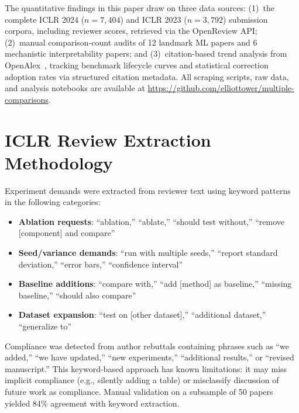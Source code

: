 \documentclass{article}
\begin{document}
The quantitative findings in this paper draw on three data sources: (1)~the complete ICLR 2024 ($n = 7{,}404$) and ICLR 2023 ($n = 3{,}792$) submission corpora, including reviewer scores, retrieved via the OpenReview API; (2)~manual comparison-count audits of 12 landmark ML papers and 6 mechanistic interpretability papers; and (3)~citation-based trend analysis from OpenAlex~\citep{priem_openalex_2022}, tracking benchmark lifecycle curves and statistical correction adoption rates via structured citation metadata. All scraping scripts, raw data, and analysis notebooks are available at \url{https://github.com/elliottower/multiple-comparisons}.

\section{ICLR Review Extraction Methodology}
\label{app:iclr_method}

Experiment demands were extracted from reviewer text using keyword patterns in the following categories:
\begin{itemize}[leftmargin=*]
  \item \textbf{Ablation requests}: ``ablation,'' ``ablate,'' ``should test without,'' ``remove [component] and compare''
  \item \textbf{Seed/variance demands}: ``run with multiple seeds,'' ``report standard deviation,'' ``error bars,'' ``confidence interval''
  \item \textbf{Baseline additions}: ``compare with,'' ``add [method] as baseline,'' ``missing baseline,'' ``should also compare''
  \item \textbf{Dataset expansion}: ``test on [other dataset],'' ``additional dataset,'' ``generalize to''
\end{itemize}
Compliance was detected from author rebuttals containing phrases such as ``we added,'' ``we have updated,'' ``new experiments,'' ``additional results,'' or ``revised manuscript.'' This keyword-based approach has known limitations: it may miss implicit compliance (e.g., silently adding a table) or misclassify discussion of future work as compliance. Manual validation on a subsample of 50 papers yielded 84\% agreement with keyword extraction.
\end{document}
